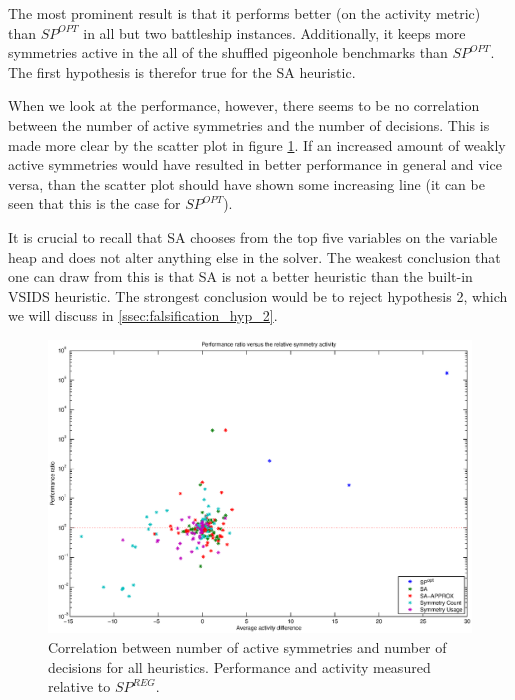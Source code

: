 	The most prominent result is that it performs better (on the activity metric) than $SP^{OPT}$ in
	all but two battleship instances.
	Additionally, it keeps more symmetries active in the all of the shuffled pigeonhole benchmarks
	than $SP^{OPT}$.
	The first hypothesis is therefor true for the SA heuristic.

	When we look at the performance, however, there seems to be no correlation
	between the number of active symmetries and the number of decisions.
	This is made more clear by the scatter plot in figure \ref{fig:correlation}.
	If an increased amount of weakly active symmetries would have resulted in better performance in
	general and vice versa, than the scatter plot should have shown some increasing line (it can be
	seen that this is the case for $SP^{OPT}$).

	It is crucial to recall that SA chooses from the top five variables on the variable heap and
	does not alter anything else in the solver.
	The weakest conclusion that one can draw from this is that SA is not a better heuristic than the
	built-in VSIDS heuristic.
	The strongest conclusion would be to reject hypothesis 2, which we will discuss in
	\ref{ssec:falsification_hyp_2}.

	\begin{figure}[!ht]
		\center
		\centerline{\includegraphics[width=1.2\textwidth]{results/scatterplot_activity.eps}}
		\caption{
			Correlation between number of active symmetries and number of decisions for all
			heuristics. Performance and activity measured relative to $SP^{REG}$.
		}
		\label{fig:correlation}
	\end{figure}


